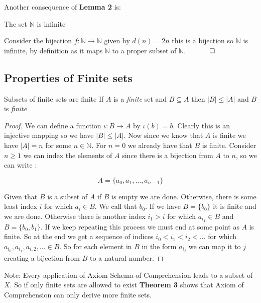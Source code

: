 \documentclass[16pt,a4paper]{article}
\theoremstyle{definition}
\begin{document}
\newpage


Another consequence of \textbf{Lemma 2} is: 
\begin{thm}{}{}
The set $\mathbb{N}$ is infinite
\end{thm}

Consider the bijection $f:\mathbb{N} \rightarrow \mathbb{N}$ given by $d(n) = 2n$ this is a bijection so $\mathbb{N}$ is infinite, by definition as it maps $\mathbb{N}$ to a proper subset of $\mathbb{N}$. $\quad \qed$




\subsection{Properties of Finite sets}
\begin{thm}{Subsets of finite sets are finite}{}
If $A$ is a \textit{finite} set and $B\subseteq A$ then $|B|\leq |A|$ and $B$ is \textit{finite}
\end{thm}{}{}

\begin{proof}
We can define a function $\iota : B\rightarrow A$ by $\iota(b) = b$. Clearly this is an injective mapping so we have $|B|\leq |A|$. Now since we know that $A$ is finite we have $|A| = n$ for some $n\in \mathbb{N}$. For $n=0$ we already have that $B$ is finite. Consider $n\geq 1$ we can index the elements of $A$ since there is a bijection from $A$ to $n$, so we can write : 

\[A = \{a_0, a_1, \ldots, a_{n-1}\}\]



Given that $B$ is a subset of $A$ if $B$ is empty we are done. Otherwise, there is some least index $i$ for which $a_i \in B$. We call that $b_0$. If we have $B = \{b_0\}$ it is finite and we are done. Otherwise there is another index $i_1 > i$ for which $a_{i_1}\in B$ and $B= \{b_0, b_1\}$. If we keep repeating this process we must end at some point as $A$ is finite. So at the end we get a sequence of indices $i_0 < i_1 < i_2 < \ldots$ for which $a_{i_0}, a_{i_1}, a_{i,2}, \ldots \in B$. So for each element in $B$ in the form $a_{i_j}$ we can map it to $j$ creating a bijection from $B$ to a natural number. 
\end{proof}

Note: Every application of Axiom Schema of Comprehension leads to a subset of $X$. So if only finite sets are allowed to exist \textbf{Theorem 3} shows that Axiom of Comprehension can only derive more finite sets. 
\end{document}
